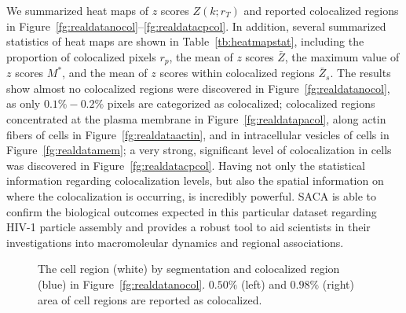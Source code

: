 \documentclass[10pt,twocolumn,twoside]{IEEEtran}
\begin{document}
We summarized heat maps of $z$ scores $Z(k;r_T)$ and reported colocalized regions in Figure~\ref{fg:realdatanocol}--\ref{fg:realdatacpcol}. In addition, several summarized statistics of heat maps are shown in Table~\ref{tb:heatmapstat}, including the proportion of colocalized pixels $r_p$, the mean of  $z$ scores $\bar{Z}$, the maximum value of $z$ scores $M^\ast$, and  the mean of  $z$ scores within colocalized regions $\bar{Z}_s$. The results show almost no colocalized regions were discovered in Figure~\ref{fg:realdatanocol}, as only $0.1\%-0.2\%$ pixels are categorized as colocalized; colocalized regions concentrated at the plasma membrane in Figure~\ref{fg:realdatapacol}, along actin fibers of cells in Figure~\ref{fg:realdataactin}, and in intracellular vesicles of cells in Figure~\ref{fg:realdatamem}; a very strong, significant level of colocalization in cells was discovered in Figure~\ref{fg:realdatacpcol}. Having not only the statistical information regarding colocalization levels, but also the spatial information on where the colocalization is occurring, is incredibly powerful.  SACA is able to confirm the biological outcomes expected in this particular dataset regarding HIV-1 particle assembly and provides a robust tool to aid scientists in their investigations into macromoleular dynamics and regional associations.

\begin{figure}[h!]
    \centering
    \caption{The cell region (white) by segmentation and colocalized region (blue) in Figure~\ref{fg:realdatanocol}. $0.50\%$ (left) and $0.98\%$ (right) area of cell regions are reported as colocalized.}\label{fg:realdatanocolvalid}
\end{figure}
\end{document}
